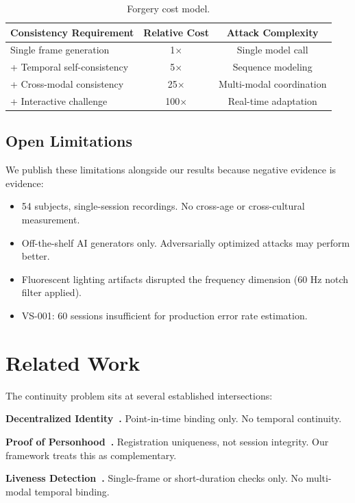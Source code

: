 \documentclass[conference]{IEEEtran}
\begin{document}
\begin{table}[H]
\centering
\caption{Forgery cost model.}
\label{tab:cost}
\begin{tabular}{lcc}
\toprule
\textbf{Consistency Requirement} & \textbf{Relative Cost} & \textbf{Attack Complexity} \\
\midrule
Single frame generation & 1$\times$ & Single model call \\
+ Temporal self-consistency & 5$\times$ & Sequence modeling \\
+ Cross-modal consistency & 25$\times$ & Multi-modal coordination \\
+ Interactive challenge & 100$\times$ & Real-time adaptation \\
\bottomrule
\end{tabular}
\end{table}

\subsection{Open Limitations}

We publish these limitations alongside our results because negative evidence is evidence:
\begin{itemize}
\item 54 subjects, single-session recordings. No cross-age or cross-cultural measurement.
\item Off-the-shelf AI generators only. Adversarially optimized attacks may perform better.
\item Fluorescent lighting artifacts disrupted the frequency dimension (60 Hz notch filter applied).
\item VS-001: 60 sessions insufficient for production error rate estimation.
\end{itemize}

\section{Related Work}

The continuity problem sits at several established intersections:

\textbf{Decentralized Identity~\cite{w3c2022did,w3c2022vc}.} Point-in-time binding only. No temporal continuity.

\textbf{Proof of Personhood~\cite{worldcoin2023,dhamija2006proof}.} Registration uniqueness, not session integrity. Our framework treats this as complementary.

\textbf{Liveness Detection~\cite{frey2019sok,shih2020real}.} Single-frame or short-duration checks only. No multi-modal temporal binding.
\end{document}
